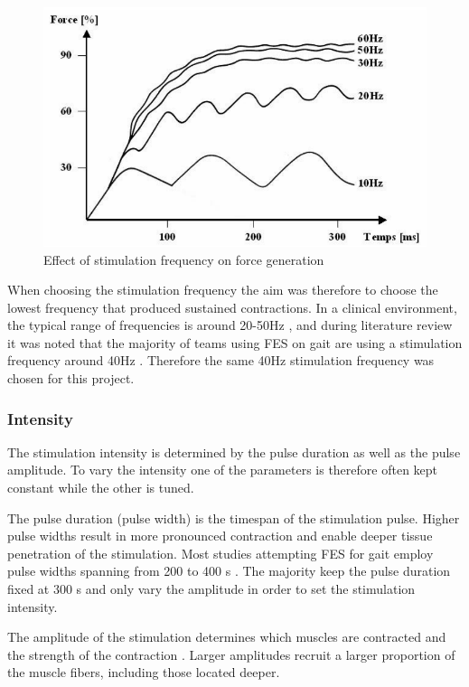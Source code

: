 \begin{figure} [H]
    \centering
    \includegraphics[width=0.7\linewidth]{images/stimfreq.png}
    \caption{Effect of stimulation frequency on force generation \cite{metrailler_systeme_2005}}
    \label{fig:stimfreq}
\end{figure}

When choosing the stimulation frequency the aim was therefore to choose the lowest frequency that produced sustained contractions. In a clinical environment, the typical range of frequencies is around 20-50Hz \cite{rupp_functional_2021}, and during literature review it was noted that the majority of teams using FES on gait are using a stimulation frequency around 40Hz \cite{aout_effects_2023}. Therefore the same 40Hz stimulation frequency was chosen for this project.

\subsubsection{Intensity}
The stimulation intensity is determined by the pulse duration as well as the pulse amplitude. To vary the intensity one of the parameters is therefore often kept constant while the other is tuned. 

The pulse duration (pulse width) is the timespan of the stimulation pulse. Higher pulse widths result in more pronounced contraction and enable deeper tissue penetration of the stimulation. Most studies attempting FES for gait employ pulse widths spanning from 200 to 400 \micro s . The majority keep the pulse duration fixed at 300 \micro s and only vary the amplitude in order to set the stimulation intensity.\cite{aout_effects_2023}

The amplitude of the stimulation determines which muscles are contracted and the strength of the contraction \cite{marquez-chin_functional_2020}. Larger amplitudes recruit a larger proportion of the muscle fibers, including those located deeper. 

